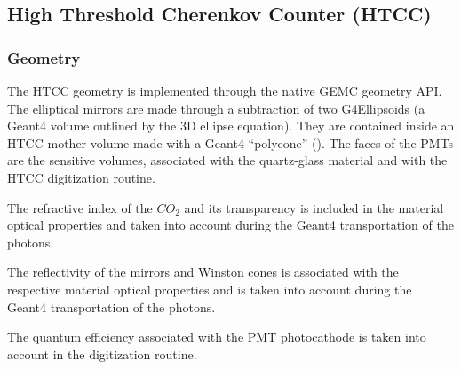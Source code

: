 \subsection{High Threshold Cherenkov Counter (HTCC)}

\subsubsection{Geometry}

The HTCC geometry is implemented through the native GEMC geometry API. The elliptical mirrors are made through a subtraction of
two G4Ellipsoids (a Geant4 volume outlined by the 3D ellipse equation).
They are contained inside an HTCC mother volume made with a Geant4 ``polycone'' ().
The faces of the PMTs are the sensitive volumes, associated with the quartz-glass material and with the HTCC digitization routine.

The refractive index of the $CO_2$ and its transparency is included in the material optical properties and taken
into account during the Geant4 transportation of the photons.

The reflectivity of the mirrors and Winston cones is associated with the respective material optical properties and is taken into
account during the Geant4 transportation of the photons.

The quantum efficiency associated with the PMT photocathode is taken into account in
the digitization routine.



